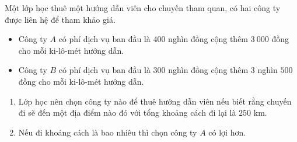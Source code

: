 \begin{bt}%
	Một lớp học thuê một hướng dẫn viên cho chuyến tham quan, có hai công ty được liên hệ  để tham khảo giá.
	\begin{itemize}
		\item Công ty $ A $ có phí dịch vụ ban đầu là $ 400 $ nghìn đồng cộng thêm $ 3~000 $ đồng cho mỗi ki-lô-mét hướng dẫn.
		\item Công ty $ B $ có phí dịch vụ ban đầu là $ 300 $ nghìn đồng cộng thêm $ 3 $ nghìn $ 500 $ đồng cho mỗi ki-lô-mét hướng dẫn.
	\end{itemize}
	\begin{enumerate}
		\item Lớp học nên chọn công ty nào để thuê hướng dẫn viên nếu biết rằng chuyến đi sẽ đến một địa điểm nào đó với tổng khoảng cách đi lại là $ 250 $ km.
		\item Nếu đi khoảng cách là bao nhiêu thì chọn công ty $ A $ có lợi hơn.
	\end{enumerate}
	
\end{bt}

